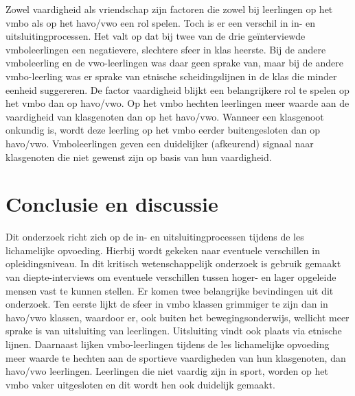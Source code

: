 \documentclass[a4paper,12pt]{memoir}
\begin{document}
Zowel vaardigheid als vriendschap zijn factoren die zowel bij leerlingen op het vmbo als op het havo/vwo een rol spelen. Toch is er een verschil in in- en uitsluitingprocessen. Het valt op dat bij twee van de drie geïnterviewde vmboleerlingen een negatievere, slechtere sfeer in klas heerste. Bij de andere vmboleerling en de vwo-leerlingen was daar geen sprake van, maar bij de andere vmbo-leerling was er sprake van etnische scheidingslijnen in de klas die minder eenheid suggereren. De factor vaardigheid blijkt een belangrijkere rol te spelen op het vmbo dan op havo/vwo. Op het vmbo hechten leerlingen meer waarde aan de vaardigheid van klasgenoten dan op het havo/vwo. Wanneer een klasgenoot onkundig is, wordt deze leerling op het vmbo eerder buitengesloten dan op havo/vwo. Vmboleerlingen geven een duidelijker (afkeurend) signaal naar klasgenoten die niet gewenst zijn op basis van hun vaardigheid.

\chapter{Conclusie en discussie}

Dit onderzoek richt zich op de in- en uitsluitingprocessen tijdens de les lichamelijke opvoeding. Hierbij wordt gekeken naar eventuele verschillen in opleidingsniveau. In dit kritisch wetenschappelijk onderzoek is gebruik gemaakt van diepte-interviews om eventuele verschillen tussen hoger- en lager opgeleide mensen vast te kunnen stellen. Er komen twee belangrijke bevindingen uit dit onderzoek. Ten eerste lijkt de sfeer in vmbo klassen grimmiger te zijn dan in havo/vwo klassen, waardoor er, ook buiten het bewegingsonderwijs, wellicht meer sprake is van uitsluiting van leerlingen. Uitsluiting vindt ook plaats via etnische lijnen. Daarnaast lijken vmbo-leerlingen tijdens de les lichamelijke opvoeding meer waarde te hechten aan de sportieve vaardigheden van hun klasgenoten, dan havo/vwo leerlingen. Leerlingen die niet vaardig zijn in sport, worden op het vmbo vaker uitgesloten en dit wordt hen ook duidelijk gemaakt.
\end{document}
